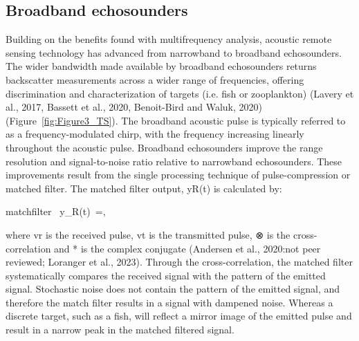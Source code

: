 
\subsection{Broadband  echosounders}
Building on the benefits found with multifrequency analysis, acoustic remote sensing technology has advanced from narrowband to broadband echosounders. The wider bandwidth made available by broadband echosounders returns backscatter measurements across a wider range of frequencies, offering discrimination and characterization of targets (i.e. fish or zooplankton) (Lavery et al., 2017, Bassett et al., 2020, Benoit-Bird and Waluk, 2020) (Figure~\ref{fig:Figure3_TS}). The broadband acoustic pulse is typically referred to as a frequency-modulated chirp, with the frequency increasing linearly throughout the acoustic pulse. Broadband echosounders improve the range resolution and signal-to-noise ratio relative to narrowband echosounders. These improvements result from the single processing technique of pulse-compression or matched filter. The matched filter output, yR(t) is calculated by:
\begin{muneqn}{matchfilter}
{\ y}_R(t)\ =,
\end{muneqn}
where vr is the received pulse, vt is the transmitted pulse, ⊗ is the cross-correlation and * is the complex conjugate (Andersen et al., 2020:not peer reviewed; Loranger et al., 2023). Through the cross-correlation, the matched filter systematically compares the received signal with the pattern of the emitted signal. Stochastic noise does not contain the pattern of the emitted signal, and therefore the match filter results in a signal with dampened noise. Whereas a discrete target, such as a fish, will reflect a mirror image of the emitted pulse and result in a narrow peak in the matched filtered signal. 
